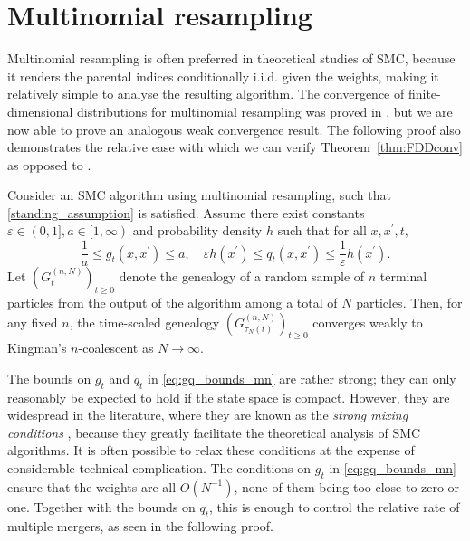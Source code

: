 \section{Multinomial resampling}
\label{sec:corol_mn}
Multinomial resampling is often preferred in theoretical studies of SMC, because it renders the parental indices conditionally i.i.d. given the weights, making it relatively simple to analyse the resulting algorithm.
The convergence of finite-dimensional distributions for multinomial resampling was proved in \textcite[Corollary 1]{koskela2018}, but we are now able to prove an analogous weak convergence result. The following proof also demonstrates the relative ease with which we can verify Theorem~\ref{thm:FDDconv} as opposed to \textcite[Theorem 1]{koskela2018}.

\begin{corollary}\label{thm:multinomial}
Consider an SMC algorithm using multinomial resampling, such that \ref{standing_assumption} is satisfied. Assume there exist constants $\varepsilon\in (0,1], a\in [1,\infty)$ and probability density $h$ such that for all $x, x^\prime, t$,
\begin{equation}\label{eq:gq_bounds_mn}
\frac{1}{a} \leq g_t(x, x^\prime) \leq a , \quad
\varepsilon h(x^\prime) \leq q_t(x, x^\prime) \leq \frac{1}{\varepsilon} h(x^\prime) .
\end{equation}
Let $(G_t^{(n,N)})_{t\geq0}$ denote the genealogy of a random sample of $n$ terminal particles from the output of the algorithm among a total of $N$ particles. Then, for any fixed $n$, the time-scaled genealogy $(G_{\tau_N(t)}^{(n,N)})_{t\geq0}$ converges weakly to Kingman's $n$-coalescent as $N\to \infty$.%
\end{corollary}
The bounds on $g_t$ and $q_t$ in \eqref{eq:gq_bounds_mn} are rather strong; they can only reasonably be expected to hold if the state space is compact. 
However, they are widespread in the literature, where they are known as the \emph{strong mixing conditions} \parencite[Section 3.5.2]{delmoral2004}, because they greatly facilitate the theoretical analysis of SMC algorithms. It is often possible to relax these conditions at the expense of considerable technical complication.
The conditions on $g_t$ in \eqref{eq:gq_bounds_mn} ensure that the weights are all $O(N^{-1})$, none of them being too close to zero or one. Together with the bounds on $q_t$, this is enough to control the relative rate of multiple mergers, as seen in the following proof.


